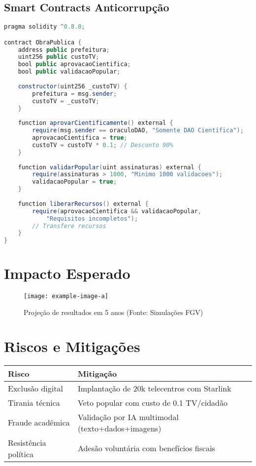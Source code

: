 \documentclass[12pt, a4paper]{article}
\begin{document}
\subsection{Smart Contracts Anticorrupção}
\begin{lstlisting}[language=Java,caption=Contrato para Obras Públicas]
pragma solidity ^0.8.0;

contract ObraPublica {
    address public prefeitura;
    uint256 public custoTV;
    bool public aprovacaoCientifica;
    bool public validacaoPopular;
    
    constructor(uint256 _custoTV) {
        prefeitura = msg.sender;
        custoTV = _custoTV;
    }
    
    function aprovarCientificamente() external {
        require(msg.sender == oraculoDAO, "Somente DAO Cientifica");
        aprovacaoCientifica = true;
        custoTV = custoTV * 0.1; // Desconto 90%
    }
    
    function validarPopular(uint assinaturas) external {
        require(assinaturas > 1000, "Minimo 1000 validacoes");
        validacaoPopular = true;
    }
    
    function liberarRecursos() external {
        require(aprovacaoCientifica && validacaoPopular, 
            "Requisitos incompletos");
        // Transfere recursos
    }
}
\end{lstlisting}

\section{Impacto Esperado}
\begin{figure}[h]
\centering
\texttt{[image: example-image-a]}
\caption{Projeção de resultados em 5 anos (Fonte: Simulações FGV)}
\end{figure}

\section{Riscos e Mitigações}
\begin{tabularx}{\textwidth}{lX}
\toprule
\textbf{Risco} & \textbf{Mitigação} \\
\midrule
Exclusão digital & Implantação de 20k telecentros com Starlink \\
Tirania técnica & Veto popular com custo de 0.1 TV/cidadão \\
Fraude acadêmica & Validação por IA multimodal (texto+dados+imagens) \\
Resistência política & Adesão voluntária com benefícios fiscais \\
\bottomrule
\end{tabularx}
\end{document}
